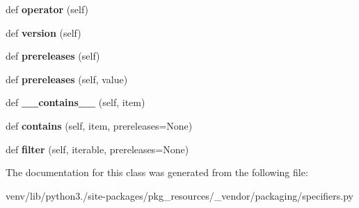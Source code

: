 \begin{DoxyCompactItemize}
def {\bfseries operator} (self)
\item 
\mbox{\label{classpkg__resources_1_1__vendor_1_1packaging_1_1specifiers_1_1___individual_specifier_a98ff7bb31634856e5dda863aacbcb98b}} 
def {\bfseries version} (self)
\item 
\mbox{\label{classpkg__resources_1_1__vendor_1_1packaging_1_1specifiers_1_1___individual_specifier_a8cca74d9dafa725b0cb9160decd0aab6}} 
def {\bfseries prereleases} (self)
\item 
\mbox{\label{classpkg__resources_1_1__vendor_1_1packaging_1_1specifiers_1_1___individual_specifier_aa902b62447455891e44472aa4d40b9b2}} 
def {\bfseries prereleases} (self, value)
\item 
\mbox{\label{classpkg__resources_1_1__vendor_1_1packaging_1_1specifiers_1_1___individual_specifier_a998cb585da2ce2cbddd8788ab1dec2e9}} 
def {\bfseries \+\_\+\+\_\+contains\+\_\+\+\_\+} (self, item)
\item 
\mbox{\label{classpkg__resources_1_1__vendor_1_1packaging_1_1specifiers_1_1___individual_specifier_afc614431c7e139a948866248f6f01bb4}} 
def {\bfseries contains} (self, item, prereleases=None)
\item 
\mbox{\label{classpkg__resources_1_1__vendor_1_1packaging_1_1specifiers_1_1___individual_specifier_a23722d79e6f85960e214288f3b782962}} 
def {\bfseries filter} (self, iterable, prereleases=None)
\end{DoxyCompactItemize}


The documentation for this class was generated from the following file\+:\begin{DoxyCompactItemize}
\item 
venv/lib/python3./site-\/packages/pkg\+\_\+resources/\+\_\+vendor/packaging/specifiers.\+py\end{DoxyCompactItemize}
